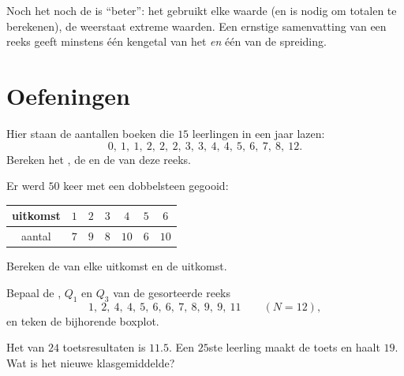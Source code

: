 \begin{remark}
Noch het  noch de  is ``beter'': het  gebruikt
elke waarde (en is nodig om totalen te berekenen), de  weerstaat
extreme waarden. Een ernstige samenvatting van een reeks geeft minstens één
kengetal van het  \emph{en} één van de spreiding.
\end{remark}

\section{Oefeningen}

\begin{exercise}[$\star$]\label{exo:g10:stats:1}
Hier staan de aantallen boeken die $15$ leerlingen in een jaar lazen:
\[
0,\ 1,\ 1,\ 2,\ 2,\ 2,\ 3,\ 3,\ 4,\ 4,\ 5,\ 6,\ 7,\ 8,\ 12 .
\]
Bereken het , de  en de  van deze reeks.
\end{exercise}

\begin{exercise}[$\star$]\label{exo:g10:stats:2}
Er werd $50$ keer met een dobbelsteen gegooid:
\begin{center}
\renewcommand{\arraystretch}{1.2}
\begin{tabular}{c|cccccc}
uitkomst & $1$ & $2$ & $3$ & $4$ & $5$ & $6$ \\
\hline
aantal & $7$ & $9$ & $8$ & $10$ & $6$ & $10$ \\
\end{tabular}
\end{center}
Bereken de  van elke uitkomst en de  uitkomst.
\end{exercise}

\begin{exercise}[$\star$]\label{exo:g10:stats:3}
Bepaal de , $Q_1$ en $Q_3$ van de gesorteerde reeks
\[
1,\ 2,\ 4,\ 4,\ 5,\ 6,\ 6,\ 7,\ 8,\ 9,\ 9,\ 11 \qquad (N = 12),
\]
en teken de bijhorende boxplot.
\end{exercise}

\begin{exercise}[$\star$]\label{exo:g10:stats:4}
Het  van $24$ toetsresultaten is $11.5$. Een $25$ste leerling maakt
de toets en haalt $19$. Wat is het nieuwe klasgemiddelde?
\end{exercise}

